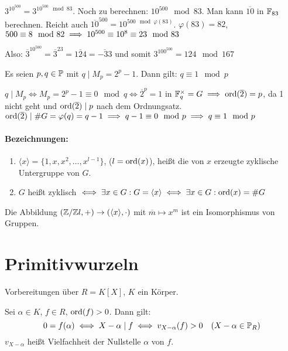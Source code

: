 \documentclass[a4paper,DIV15,BCOR12mm]{article}
\begin{document}
$3^{10^{500}} = 3^{10^{500} \mod 83}$. Noch zu berechnen: $10^{500}
\mod 83$. Man kann $\overline{10}$ in $\mathbb{F}_{83}$ berechnen. Reicht
auch $\overline{10}^{500} = 10^{500\mod \varphi(83)}$. $\varphi(83)
= 82$, $500\equiv 8 \mod 82 \implies 10^{500} \equiv 10^8 \equiv 23
\mod 83$

Also: $\overline 3 ^{10 ^{500}} = \overline 3 ^{23} =
\overline{124}= \overline{-33}$ und somit $3^{100^{500}} = 124 \mod
167$

\begin{satz}
Es seien $p,q\in\mathbb{P}$ mit $q \mid M_p = 2^p-1$. Dann gilt: $q\equiv
1 \mod p$
\end{satz}

\begin{beweis}
$q\mid M_p \iff M_p = 2^p-1 \equiv 0 \mod q \iff \overline 2^p = 1$
in $\mathbb{F}_q^\times=G \implies \mathop{\rm ord}\nolimits(\overline 2) = p$, da 1 nicht geht
und $\mathop{\rm ord}\nolimits(\overline 2)\mid p$ nach dem Ordnungsatz. $\mathop{\rm ord}\nolimits(\overline
2) \mid \# G = \varphi(q) = q-1 \implies q-1 \equiv 0 \mod p \implies q
\equiv 1 \mod p$
\end{beweis}


\paragraph{Bezeichnungen:}
\begin{enumerate}
\item $\langle x \rangle  = \{1,x,x^2,\ldots,x^{l-1}\}$, ($l=\mathop{\rm ord}\nolimits(x)$), heißt die von $x$ erzeugte zyklische Untergruppe von $G$.
\item $G$ heißt zyklisch $\iff \exists x \in G: G=\langle x\rangle  \iff \exists x \in G: \mathop{\rm ord}\nolimits(x)=\#G$
\end{enumerate}

\begin{bemerkung}
Die Abbildung $(\mathbb{Z}/\mathbb{Z} l,+)\to (\langle x\rangle ,\cdot)$ mit
$\overline m \mapsto x^m$ ist ein Isomorphismus von Gruppen.
\end{bemerkung}
\section{Primitivwurzeln}

Vorbereitungen über $R=K[X]$, $K$ ein Körper.

\begin{bemerkung}
Sei $\alpha \in K$, $f\in R$, $\mathop{\rm ord}\nolimits(f)>0$. Dann gilt:
\[ 0 = f(\alpha) \iff X-\alpha \mid f \iff v_{X-\alpha}(f) > 0 \quad ( X-\alpha \in \mathbb{P}_{R} )\]
$v_{X-\alpha}$ heißt Vielfachheit der Nullstelle $\alpha$ von $f$.
\end{bemerkung}
\end{document}
